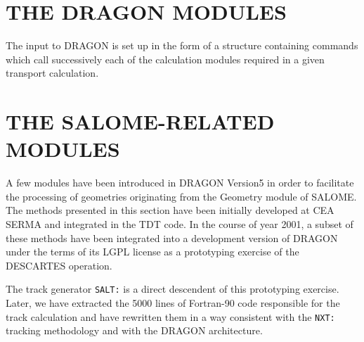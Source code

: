 \section{THE DRAGON MODULES}\label{sect:DragonModuleInput}

The input to DRAGON is set up in the form of a structure containing commands
which call successively each of the calculation modules required in a given
transport calculation.


\section{THE SALOME-RELATED MODULES}\label{sect:SalomeModuleInput}

A few modules have been introduced in DRAGON Version5 in order to facilitate the
processing of geometries originating from the Geometry module of SALOME.\cite{salome}
The methods presented in this section have been initially developed at CEA SERMA and
integrated in the TDT code.\cite{tdt,lyioussi} In the course of year 2001, a subset of
these methods have been integrated into a development version of DRAGON under the terms
of its LGPL license as a prototyping exercise of the DESCARTES operation.\cite{salt}

\vskip 0.08cm

The track generator {\tt SALT:} is a direct descendent of this prototyping exercise.
Later, we have extracted the 5000 lines of Fortran-90 code responsible for the track
calculation and have rewritten them in a way consistent with the {\tt NXT:} tracking
methodology and with the DRAGON architecture.

